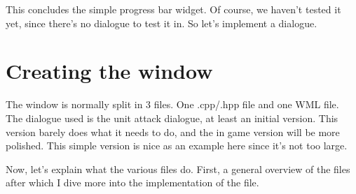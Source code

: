 This concludes the simple progress bar widget. Of course, we haven't tested it
yet, since there's no dialogue to test it in. So let's implement a dialogue.


\section{Creating the window}
\label{sec:creating_the_window}

The window is normally split in 3 files. One .cpp/.hpp file and one WML file.
The dialogue used is the unit attack dialogue, at least an initial version. This
version barely does what it needs to do, and the in game version will be more
polished. This simple version is nice as an example here since it's not too large.

Now, let's explain what the various files do. First, a general overview of
the files after which I dive more into the implementation of the file.


